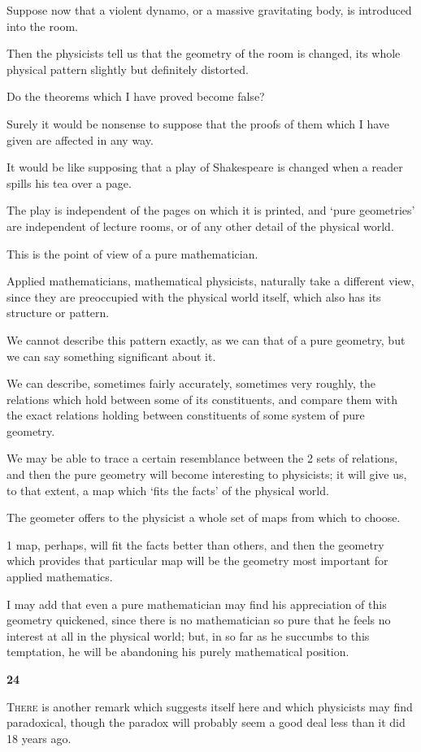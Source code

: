 \documentclass{article}
\numberwithin{equation}{section}
\begin{document}
Suppose now that a violent dynamo, or a massive gravitating body, is introduced into the room.

Then the physicists tell us that the geometry of the room is changed, its whole physical pattern slightly but definitely distorted.

Do the theorems which I have proved become false?

Surely it would be nonsense to suppose that the proofs of them which I have given are affected in any way.

It would be like supposing that a play of Shakespeare is changed when a reader spills his tea over a page.

The play is independent of the pages on which it is printed, and `pure geometries' are independent of lecture rooms, or of any other detail of the physical world.

%
This is the point of view of a pure mathematician.

Applied mathematicians, mathematical physicists, naturally take a different view, since they are preoccupied with the physical world itself, which also has its structure or pattern.

We cannot describe this pattern exactly, as we can that of a pure geometry, but we can say something significant about it.

We can describe, sometimes fairly accurately, sometimes very roughly, the relations which hold between some of its constituents, and compare them with the exact relations holding between constituents of some system of pure geometry.

We may be able to trace a certain resemblance between the 2 sets of relations, and then the pure geometry will become interesting to physicists; it will give us, to that extent, a map which `fits the facts' of the physical world.

The geometer offers to the physicist a whole set of maps from which to choose.

1 map, perhaps, will fit the facts better than others, and then the geometry which provides that particular map will be the geometry most important for applied mathematics.

I may add that even a pure mathematician may find his appreciation of this geometry quickened, since there is no mathematician so pure that he feels no interest at all in the physical world; but, in so far as he succumbs to this temptation, he will be abandoning his purely mathematical position.

\begin{center}
    \large\textbf{24}
\end{center}
\textsc{There} is another remark which suggests itself here and which physicists may find paradoxical, though the paradox will probably seem a good deal less than it did 18 years ago.
\end{document}
